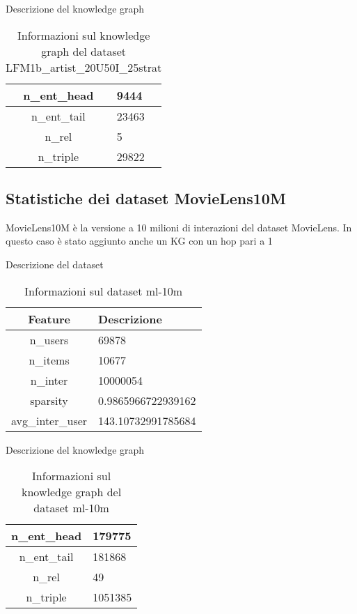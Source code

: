 \noindent Descrizione del knowledge graph
\begin{table}[H]
    \centering
    \footnotesize
    \begin{tabularx}{\textwidth}{|c|X|}
        \hline
        n\_ent\_head & 9444 \\
        \hline
        n\_ent\_tail & 23463 \\
        \hline
        n\_rel & 5 \\
        \hline
        n\_triple & 29822 \\
        \hline
    \end{tabularx}
    \caption{Informazioni sul knowledge graph del dataset LFM1b\_artist\_20U50I\_25strat}
    \label{tab:dataset_info}
\end{table}

\newpage

\subsection{Statistiche dei dataset MovieLens10M}

\noindent MovieLens10M è la versione a 10 milioni di interazioni del dataset MovieLens. In questo caso è stato aggiunto anche un KG con un hop pari a 1

\noindent Descrizione del dataset
\begin{table}[H]
    \centering
    \footnotesize
    \begin{tabularx}{\textwidth}{|c|X|}
        \hline
        \textbf{Feature} & \textbf{Descrizione} \\
        \hline
        n\_users & 69878 \\
        \hline
        n\_items & 10677 \\
        \hline
        n\_inter & 10000054 \\
        \hline
        sparsity & 0.9865966722939162 \\
        \hline
        avg\_inter\_user & 143.10732991785684 \\
        \hline
    \end{tabularx}
    \caption{Informazioni sul dataset ml-10m}
    \label{tab:dataset_info}
\end{table}


\noindent Descrizione del knowledge graph
\begin{table}[H]
    \centering
    \footnotesize
    \begin{tabularx}{\textwidth}{|c|X|}
        \hline
        n\_ent\_head & 179775 \\
        \hline
        n\_ent\_tail & 181868 \\
        \hline
        n\_rel & 49 \\
        \hline
        n\_triple & 1051385 \\
        \hline
    \end{tabularx}
    \caption{Informazioni sul knowledge graph del dataset ml-10m}
    \label{tab:dataset_info}
\end{table}



